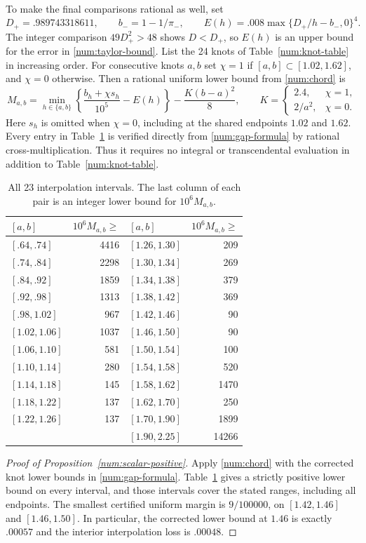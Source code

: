 To make the final comparisons rational as well, set
\[
 D_+=.989743318611,\qquad
 b_-=1-1/\pi_-,\qquad
 E(h)=.008\max\{D_+/h-b_-,0\}^4.
\]
The integer comparison $49D_+^2>48$ shows $D<D_+$,
so $E(h)$ is an upper bound for the error in
\eqref{num:taylor-bound}. List the 24 knots of
Table~\ref{num:knot-table} in increasing order. For consecutive knots
$a,b$ set $\chi=1$ if $[a,b]\subset[1.02,1.62]$, and
$\chi=0$ otherwise. Then a rational uniform lower bound from
\eqref{num:chord} is
\begin{equation}\label{num:gap-formula}
 M_{a,b}=
 \min_{h\in\{a,b\}}
       \left\{\frac{b_h+\chi s_h}{10^5}-E(h)\right\}
       -\frac{K(b-a)^2}{8},
 \qquad K=\begin{cases}2.4,&\chi=1,\\2/a^2,&\chi=0.\end{cases}
\end{equation}
Here $s_h$ is omitted when $\chi=0$, including at the shared endpoints
$1.02$ and $1.62$. Every entry in Table~\ref{num:gap-table} is
verified directly from \eqref{num:gap-formula} by rational
cross-multiplication. Thus it requires no integral or transcendental
evaluation in addition to Table~\ref{num:knot-table}.

\begin{table}[H]
\centering
\caption{All 23 interpolation intervals. The last column of each pair
is an integer lower bound for $10^6M_{a,b}$.}
\label{num:gap-table}
\begin{tabular}{lr@{\qquad}lr}
\toprule
$[a,b]$&$10^6M_{a,b}\ge$&$[a,b]$&$10^6M_{a,b}\ge$\\
\midrule
$[.64,.74]$&4416&$[1.26,1.30]$&209\\
$[.74,.84]$&2298&$[1.30,1.34]$&269\\
$[.84,.92]$&1859&$[1.34,1.38]$&379\\
$[.92,.98]$&1313&$[1.38,1.42]$&369\\
$[.98,1.02]$&967&$[1.42,1.46]$&90\\
$[1.02,1.06]$&1037&$[1.46,1.50]$&90\\
$[1.06,1.10]$&581&$[1.50,1.54]$&100\\
$[1.10,1.14]$&280&$[1.54,1.58]$&520\\
$[1.14,1.18]$&145&$[1.58,1.62]$&1470\\
$[1.18,1.22]$&137&$[1.62,1.70]$&250\\
$[1.22,1.26]$&137&$[1.70,1.90]$&1899\\
&&$[1.90,2.25]$&14266\\
\bottomrule
\end{tabular}
\end{table}

\begin{proof}[Proof of Proposition~\ref{num:scalar-positive}]
Apply \eqref{num:chord} with the corrected knot lower bounds in
\eqref{num:gap-formula}. Table~\ref{num:gap-table} gives a strictly
positive lower bound on every interval, and those intervals cover
the stated ranges, including all endpoints. The smallest certified
uniform margin is $9/100000$, on $[1.42,1.46]$ and $[1.46,1.50]$.
In particular, the corrected lower bound at $1.46$ is exactly
$.00057$ and the interior interpolation loss is $.00048$.
\end{proof}
